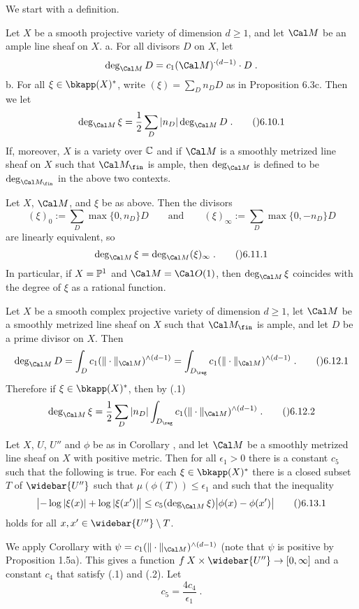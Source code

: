 We start with a definition.

  Let $X$ be a smooth projective variety of dimension $d\ge1$,
and let $\Cal M$ be an ample line sheaf on $X$.
\roster
\myitem a.  For all divisors $D$ on $X$, let
$$\deg_{\Cal M} D = c_1(\Cal M)^{{}\cdot(d-1)}\cdot D\;.$$
\myitem b.  For all $\xi\in\bkapp(X)^{*}$, write $(\xi)=\sum_D n_D D$ as in
Proposition \06.3c.  Then we let
$$\deg_{\Cal M} \xi = \frac12\sum_D |n_D|\deg_{\Cal M}D\;.\tag\06.10.1$$
\endroster
If, moreover, $X$ is a variety over $\Bbb C$ and if $\Cal M$ is a
smoothly metrized
line sheaf on $X$ such that $\Cal M_\fin$ is ample, then $\deg_{\Cal M}$
is defined to be $\deg_{\Cal M_\fin}$ in the above two contexts.
\endit

  Let $X$, $\Cal M$, and $\xi$ be as above.  Then the divisors
$$(\xi)_0:=\sum_D\max\{0,n_D\} D \qquad\text{and}\qquad
  (\xi)_\infty := \sum_D\max\{0,-n_D\} D$$
are linearly equivalent, so
$$\deg_{\Cal M}\xi = \deg_{\Cal M} (\xi)_\infty\;.\tag\06.11.1$$
In particular, if $X=\Bbb P^1$ and $\Cal M=\Cal O(1)$, then $\deg_{\Cal M}\xi$
coincides with the degree of $\xi$ as a rational function.
\endit

  Let $X$ be a smooth complex projective variety
of dimension $d\ge1$, let $\Cal M$ be a smoothly metrized line sheaf on $X$
such that $\Cal M_\fin$ is ample, and let $D$ be a prime divisor on $X$.  Then
$$\deg_{\Cal M} D = \int_D c_1(\|\cdot\|_{\Cal M})^{{}\wedge(d-1)}
  = \int_{D_\reg} c_1(\|\cdot\|_{\Cal M})^{{}\wedge(d-1)}\;.\tag\06.12.1$$
Therefore if $\xi\in\bkapp(X)^{*}$, then by (.1)
$$\deg_{\Cal M} \xi
  = \frac12\sum_D |n_D| \int_{D_\reg} c_1(\|\cdot\|_{\Cal M})^{{}\wedge(d-1)}\;.
  \tag\06.12.2$$
\endit

  Let $X$, $U$, $U''$ and $\phi$ be as in Corollary ,
and let $\Cal M$ be a smoothly metrized line sheaf on $X$ with positive metric.
Then for all $\epsilon_1>0$ there is a constant $c_5$
such that the following is true.  For each $\xi\in\bkapp(X)^{*}$ there is a
closed subset $T$ of $\widebar{U''}$ such that $\mu(\phi(T))\le\epsilon_1$
and such that the inequality
$$\bigl|-\log|\xi(x)|+\log|\xi(x')|\bigr|
  \le c_5(\deg_{\Cal M}\xi) \bigl|\phi(x)-\phi(x')\bigr|
  \tag\06.13.1$$
holds for all $x,x'\in\widebar{U''}\setminus T$.
\endit

We apply Corollary  with $\psi=c_1(\|\cdot\|_{\Cal M})^{\wedge(d-1)}$
(note that $\psi$ is positive by Proposition \01.5a).
This gives a function $f\:X\times\widebar{U''}\to[0,\infty]$
and a constant $c_4$ that satisfy (.1) and (.2).  Let
$$c_5 = \frac{4c_4}{\epsilon_1}\;.$$

